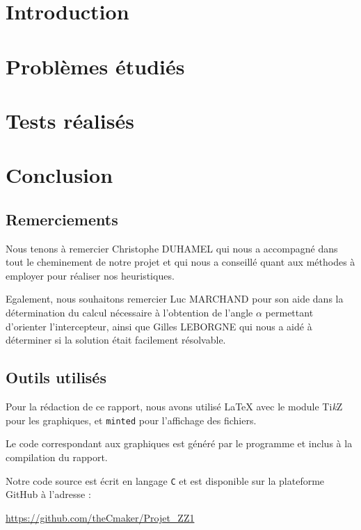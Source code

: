 \documentclass{report}
\newcommand{\TikZ}{Ti{\color{orange}\textit{k}}Z}
\newcommand{\blankpage}{\newpage \thispagestyle{empty} \addtocounter{page}{-1} \null \newpage}
\begin{document}
  
  \setlength{\parskip}{10pt}
  \setlength{\parindent}{0pt}
  \tableofcontents
  \listoffigures
  \listoftables
  \begingroup
    \let\clearpage\relax
    \listoflistings
  \endgroup

  \chapter{Introduction}
    
  
  \chapter{Problèmes étudiés}
    
  
  \chapter{Tests réalisés}
    
  
  \chapter{Conclusion}
    
  
  \section*{Remerciements}
    Nous tenons à remercier Christophe DUHAMEL qui nous a accompagné dans tout le cheminement de notre projet et qui nous a conseillé quant aux méthodes à employer pour réaliser nos heuristiques.

    Egalement, nous souhaitons remercier Luc MARCHAND pour son aide dans la détermination du calcul nécessaire à l'obtention de l'angle $\alpha$ permettant d'orienter l'intercepteur, ainsi que Gilles LEBORGNE qui nous a aidé à déterminer si la solution était facilement résolvable.

  \section*{Outils utilisés}
    Pour la rédaction de ce rapport, nous avons utilisé \LaTeX{} avec le module \TikZ{} pour les graphiques, et \texttt{minted} pour l'affichage des fichiers.

    Le code correspondant aux graphiques est généré par le programme et inclus à la compilation du rapport.

    Notre code source est écrit en langage \texttt{C} et est disponible sur la plateforme GitHub à l'adresse :
    \begin{center}
      \href{https://github.com/theCmaker/Projet\_ZZ1}{https://github.com/theCmaker/Projet\_ZZ1}
    \end{center}
\end{document}
